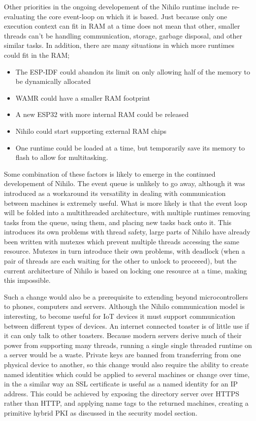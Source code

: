 \documentclass{article}
\begin{document}
Other priorities in the ongoing developement of the Nihilo runtime include re-evaluating the core event-loop on which it is based. Just because only one execution context can fit in RAM at a time does not mean that other, smaller threads can't be handling communication, storage, garbage disposal, and other similar tasks. In addition, there are many situations in which more runtimes could fit in the RAM;
\begin{itemize}
\item The ESP-IDF could abandon its limit on only allowing half of the memory to be dynamically allocated
\item WAMR could have a smaller RAM footprint
\item A new ESP32 with more internal RAM could be released
\item Nihilo could start supporting external RAM chips
\item One runtime could be loaded at a time, but temporarily save its memory to flash to allow for multitasking.
\end{itemize}

Some combination of these factors is likely to emerge in the continued developement of Nihilo. The event queue is unlikely to go away, although it was introduced as a workaround its versatility in dealing with communication between machines is extremely useful. What is more likely is that the event loop will be folded into a multithreaded architecture, with multiple runtimes removing tasks from the queue, using them, and placing new tasks back onto it. This introduces its own problems with thread safety, large parts of Nihilo have already been written with mutexes which prevent multiple threads accessing the same resource. Mutexes in turn introduce their own problems, with deadlock (when a pair of threads are each waiting for the other to unlock to proceeed), but the current architecture of Nihilo is based on locking one resource at a time, making this impossible.

Such a change would also be a prerequisite to extending beyond microcontrollers to phones, computers and servers. Although the Nihilo communication model is interesting, to become useful for IoT devices it must support communication between different types of devices. An internet connected toaster is of little use if it can only talk to other toasters. Because modern servers derive much of their power from supporting many threads, running a single single threaded runtime on a server would be a waste. Private keys are banned from transferring from one physical device to another, so this change would also require the ability to create named identities which could be applied to several machines or change over time, in  the a similar way an SSL certificate is useful as a named identity for an IP address. This could be achieved by exposing the directory server over HTTPS rather than HTTP, and applying name tags to the returned machines, creating a primitive hybrid PKI as discussed in the security model section.
\end{document}
